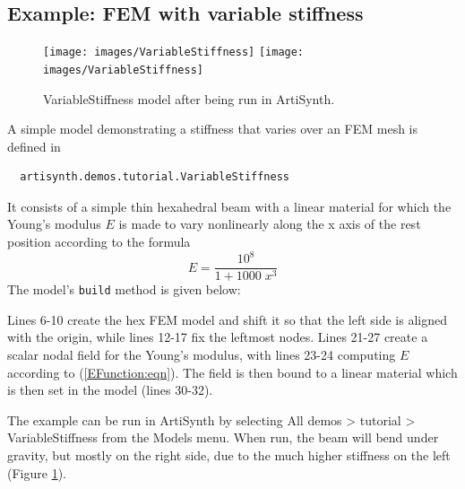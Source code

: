 \subsection{Example: FEM with variable stiffness}
\label{VariableStiffness:sec}

\begin{figure}[ht]
\begin{center}
\iflatexml
 \texttt{[image: images/VariableStiffness]}
\else
 \texttt{[image: images/VariableStiffness]}
\fi
\end{center}
\caption{VariableStiffness model after being run in ArtiSynth.}
\label{VariableStiffness:fig}
\end{figure}

A simple model demonstrating a stiffness that varies over
an FEM mesh is defined in
%
\begin{verbatim}
  artisynth.demos.tutorial.VariableStiffness
\end{verbatim}
%
It consists of a simple thin hexahedral beam with a linear material
for which the Young's modulus $E$ is made to vary nonlinearly along the
x axis of the rest position according to the formula
%
\begin{equation}
E = \frac{10^8}{1 + 1000 \; x^3}
\label{EFunction:eqn}
\end{equation}
%
The model's {\tt build} method is given below:
\lstset{numbers=left}
\iflatexml

\else

\fi
\lstset{numbers=none}

Lines 6-10 create the hex FEM model and shift it so that the left side
is aligned with the origin, while lines 12-17 fix the leftmost
nodes. Lines 21-27 create a scalar nodal field for the Young's modulus,
with lines 23-24 computing $E$ according to (\ref{EFunction:eqn}).
The field is then bound to a linear material which is then set in the
model (lines 30-32).

The example can be run in ArtiSynth by selecting {\sf All demos >
tutorial > VariableStiffness} from the {\sf Models} menu.  When run,
the beam will bend under gravity, but mostly on the right side, due to
the much higher stiffness on the left (Figure
\ref{VariableStiffness:fig}).


